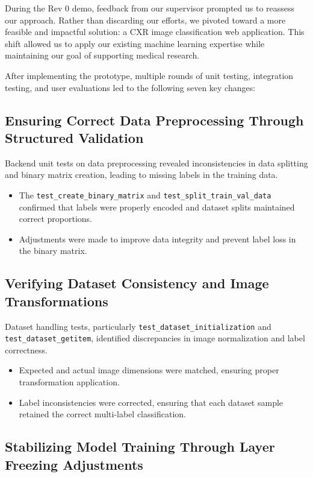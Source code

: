 \documentclass[12pt, titlepage]{article}
\begin{document}
During the Rev 0 demo, feedback from our supervisor prompted us to reassess our approach. Rather than discarding our efforts, we pivoted toward a more feasible and impactful solution: a CXR image classification web application. This shift allowed us to apply our existing machine learning expertise while maintaining our goal of supporting medical research.

After implementing the prototype, multiple rounds of unit testing, integration testing, and user evaluations led to the following seven key changes:

\subsection{Ensuring Correct Data Preprocessing Through Structured Validation}

Backend unit tests on data preprocessing revealed inconsistencies in data splitting and binary matrix creation, leading to missing labels in the training data.
\begin{itemize}
    \item The \texttt{test\_create\_binary\_matrix} and \texttt{test\_split\_train\_val\_data} confirmed that labels were properly encoded and dataset splits maintained correct proportions.
    \item Adjustments were made to improve data integrity and prevent label loss in the binary matrix.
\end{itemize}

\subsection{Verifying Dataset Consistency and Image Transformations}

Dataset handling tests, particularly \texttt{test\_dataset\_initialization} and \texttt{test\_dataset\_getitem}, identified discrepancies in image normalization and label correctness.
\begin{itemize}
    \item Expected and actual image dimensions were matched, ensuring proper transformation application.
    \item Label inconsistencies were corrected, ensuring that each dataset sample retained the correct multi-label classification.
\end{itemize}

\subsection{Stabilizing Model Training Through Layer Freezing Adjustments}
\end{document}
